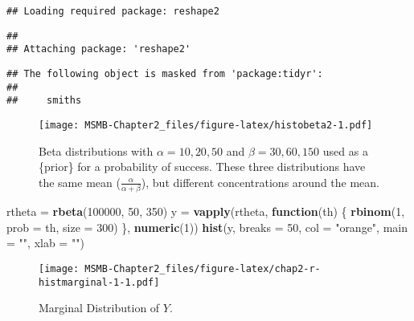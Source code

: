 \documentclass[]{article}
\newenvironment{Shaded}{\begin{snugshade}}{\end{snugshade}}
\newcommand{\KeywordTok}[1]{\textcolor[rgb]{0.13,0.29,0.53}{\textbf{#1}}}
\newcommand{\DataTypeTok}[1]{\textcolor[rgb]{0.13,0.29,0.53}{#1}}
\newcommand{\DecValTok}[1]{\textcolor[rgb]{0.00,0.00,0.81}{#1}}
\newcommand{\StringTok}[1]{\textcolor[rgb]{0.31,0.60,0.02}{#1}}
\newcommand{\ControlFlowTok}[1]{\textcolor[rgb]{0.13,0.29,0.53}{\textbf{#1}}}
\newcommand{\NormalTok}[1]{#1}
\begin{document}
\begin{verbatim}
## Loading required package: reshape2
\end{verbatim}

\begin{verbatim}
## 
## Attaching package: 'reshape2'
\end{verbatim}

\begin{verbatim}
## The following object is masked from 'package:tidyr':
## 
##     smiths
\end{verbatim}

\begin{figure}
\centering
\texttt{[image: MSMB-Chapter2\_files/figure-latex/histobeta2-1.pdf]}
\caption{Beta distributions with \(\alpha=10,20,50\) and
\(\beta=30,60,150\) used as a \{prior\} for a probability of success.
These three distributions have the same mean
(\(\frac{\alpha}{\alpha +\beta}\)), but different concentrations around
the mean.}
\end{figure}

\begin{Shaded}
\begin{Highlighting}[]
\NormalTok{rtheta =}\StringTok{ }\KeywordTok{rbeta}\NormalTok{(}\DecValTok{100000}\NormalTok{, }\DecValTok{50}\NormalTok{, }\DecValTok{350}\NormalTok{)}
\NormalTok{y =}\StringTok{ }\KeywordTok{vapply}\NormalTok{(rtheta, }\ControlFlowTok{function}\NormalTok{(th) \{}
  \KeywordTok{rbinom}\NormalTok{(}\DecValTok{1}\NormalTok{, }\DataTypeTok{prob =}\NormalTok{ th, }\DataTypeTok{size =} \DecValTok{300}\NormalTok{)}
\NormalTok{\}, }\KeywordTok{numeric}\NormalTok{(}\DecValTok{1}\NormalTok{))}
\KeywordTok{hist}\NormalTok{(y, }\DataTypeTok{breaks =} \DecValTok{50}\NormalTok{, }\DataTypeTok{col =} \StringTok{"orange"}\NormalTok{, }\DataTypeTok{main =} \StringTok{""}\NormalTok{, }\DataTypeTok{xlab =} \StringTok{""}\NormalTok{)}
\end{Highlighting}
\end{Shaded}

\begin{figure}
\centering
\texttt{[image: MSMB-Chapter2\_files/figure-latex/chap2-r-histmarginal-1-1.pdf]}
\caption{Marginal Distribution of \(Y\).}
\end{figure}
\end{document}
